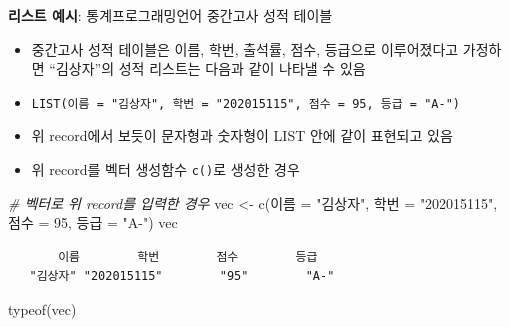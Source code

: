 \documentclass[
  11pt,
]{krantz}
\makeatletter
\newenvironment{Shaded}{\begin{snugshade}}{\end{snugshade}}
\newcommand{\AttributeTok}[1]{\textcolor[rgb]{0.61,0.61,0.61}{#1}}
\newcommand{\CommentTok}[1]{\textcolor[rgb]{0.37,0.37,0.37}{\textit{#1}}}
\newcommand{\DecValTok}[1]{\textcolor[rgb]{0.06,0.06,0.06}{#1}}
\newcommand{\FunctionTok}[1]{\textcolor[rgb]{0,0,0}{#1}}
\newcommand{\NormalTok}[1]{#1}
\newcommand{\OtherTok}[1]{\textcolor[rgb]{0.37,0.37,0.37}{#1}}
\newcommand{\StringTok}[1]{\textcolor[rgb]{0.5,0.5,0.5}{#1}}
\providecommand{\tightlist}{%
  \setlength{\itemsep}{0pt}\setlength{\parskip}{0pt}}
\newenvironment{kframe}{%
\medskip{}
\setlength{\fboxsep}{.8em}
 \def\at@end@of@kframe{}%
 \ifinner\ifhmode%
  \def\at@end@of@kframe{\end{minipage}}%
  \begin{minipage}{\columnwidth}%
 \fi\fi%
 \def\FrameCommand##1{\hskip\@totalleftmargin \hskip-\fboxsep
 \colorbox{shadecolor}{##1}\hskip-\fboxsep
     \hskip-\linewidth \hskip-\@totalleftmargin \hskip\columnwidth}%
 \MakeFramed {\advance\hsize-\width
   \@totalleftmargin\z@ \linewidth\hsize
   \@setminipage}}%
 {\par\unskip\endMakeFramed%
 \at@end@of@kframe}
\newenvironment{rmdblock}[1]
  {
  \begin{itemize}
  \renewcommand{\labelitemi}{
    \raisebox{-.7\height}[0pt][0pt]{
      {\setkeys{Gin}{width=3em,keepaspectratio}\texttt{[image: images/\#1]}}
    }
  }
  \setlength{\fboxsep}{1em}
  \begin{kframe}
  \item
  }
  {
  \end{kframe}
  \end{itemize}
  }
\newenvironment{rmdnote}
  {\begin{rmdblock}{note}}
  {\end{rmdblock}}
\makeatother
\begin{document}
\footnotesize

\begin{rmdnote}
\textbf{리스트 예시}: 통계프로그래밍언어 중간고사 성적 테이블

\begin{itemize}
\tightlist
\item
  중간고사 성적 테이블은 이름, 학번, 출석률, 점수, 등급으로 이루어졌다고 가정하면 ``김상자''의 성적 리스트는 다음과 같이 나타낼 수 있음
\item
  \texttt{LIST(이름\ =\ "김상자",\ 학번\ =\ "202015115",\ 점수\ =\ 95,\ 등급\ =\ "A-")}
\item
  위 record에서 보듯이 문자형과 숫자형이 LIST 안에 같이 표현되고 있음
\end{itemize}
\end{rmdnote}

\normalsize

\begin{itemize}
\tightlist
\item
  위 record를 벡터 생성함수 \texttt{c()}로 생성한 경우
\end{itemize}

\footnotesize

\begin{Shaded}
\begin{Highlighting}[]
\CommentTok{\# 벡터로 위 record를 입력한 경우}
\NormalTok{vec }\OtherTok{\textless{}{-}} \FunctionTok{c}\NormalTok{(}\StringTok{\textasciigrave{}}\AttributeTok{이름}\StringTok{\textasciigrave{}} \OtherTok{=} \StringTok{"김상자"}\NormalTok{, }\StringTok{\textasciigrave{}}\AttributeTok{학번}\StringTok{\textasciigrave{}} \OtherTok{=} \StringTok{"202015115"}\NormalTok{, }
         \StringTok{\textasciigrave{}}\AttributeTok{점수}\StringTok{\textasciigrave{}} \OtherTok{=} \DecValTok{95}\NormalTok{, }\StringTok{\textasciigrave{}}\AttributeTok{등급}\StringTok{\textasciigrave{}} \OtherTok{=} \StringTok{"A{-}"}\NormalTok{)}
\NormalTok{vec}
\end{Highlighting}
\end{Shaded}

\begin{verbatim}
       이름        학번        점수        등급 
   "김상자" "202015115"        "95"        "A-" 
\end{verbatim}

\begin{Shaded}
\begin{Highlighting}[]
\FunctionTok{typeof}\NormalTok{(vec)}
\end{Highlighting}
\end{Shaded}
\end{document}
